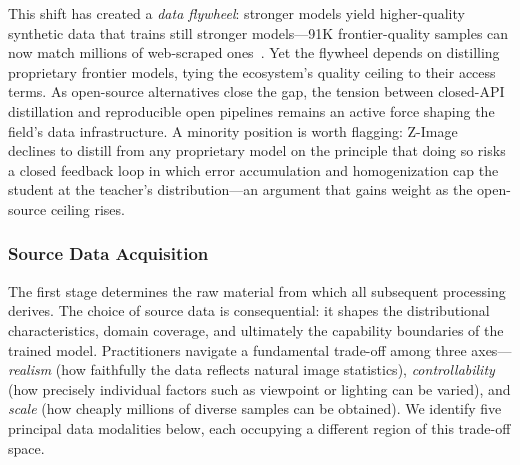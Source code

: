 This shift has created a \emph{data flywheel}: stronger models yield higher-quality synthetic data that trains still stronger models---91K frontier-quality samples can now match millions of web-scraped ones~\citep{chen2025sharegpt}. Yet the flywheel depends on distilling proprietary frontier models, tying the ecosystem's quality ceiling to their access terms. As open-source alternatives close the gap, the tension between closed-API distillation and reproducible open pipelines remains an active force shaping the field's data infrastructure. A minority position is worth flagging: Z-Image~\citep{cai2025z} declines to distill from any proprietary model on the principle that doing so risks a closed feedback loop in which error accumulation and homogenization cap the student at the teacher's distribution---an argument that gains weight as the open-source ceiling rises.


\subsubsection{Source Data Acquisition}\label{sec:source}

The first stage determines the raw material from which all subsequent processing derives. The choice of source data is consequential: it shapes the distributional characteristics, domain coverage, and ultimately the capability boundaries of the trained model. Practitioners navigate a fundamental trade-off among three axes---\emph{realism} (how faithfully the data reflects natural image statistics), \emph{controllability} (how precisely individual factors such as viewpoint or lighting can be varied), and \emph{scale} (how cheaply millions of diverse samples can be obtained). We identify five principal data modalities below, each occupying a different region of this trade-off space.

